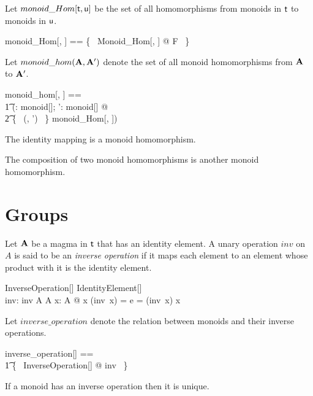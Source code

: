 \documentclass{amsart}
\begin{document}
Let $monoid\_Hom[\mathsf{t}, \mathsf{u}]$ be the set of all homomorphisms from monoids in $\mathsf{t}$
to monoids in $\mathsf{u}$.

\begin{zed}
	monoid\_Hom[\genT, \genU] == \{~ Monoid\_Hom[\genT, \genU] @ F ~\}
\end{zed}

Let $monoid\_hom(\mathbf{A}, \mathbf{A}')$ denote the set of all monoid homomorphisms from $\mathbf{A}$ to $\mathbf{A}'$.

\begin{zed}
	monoid\_hom[\genT, \genU] == \\
	\t1	(\lambda \strucA: monoid[\genT]; \strucA': monoid[\genU] @ \\
	\t2		\{~ (\strucA, \strucA') ~\} \dres monoid\_Hom[\genT, \genU])
\end{zed}

\begin{remark}
The identity mapping is a monoid homomorphism.
\end{remark}

\begin{remark}
The composition of two monoid homomorphisms is another monoid homomorphism.
\end{remark}

\section{Groups}

Let $\mathbf{A}$ be a magma in $\mathsf{t}$ that has an identity element.
A unary operation $inv$ on $A$ is said to be an \textit{inverse operation} if it maps each element
to an element whose product with it is the identity element.

\begin{schema}{InverseOperation}[\genT]
	IdentityElement[\genT] \\
	inv: \genT \pfun \genT
\where
	inv \in A \fun A
\also
	\forall x: A @ x \opG (inv~x) = e = (inv~x)  \opG x
\end{schema}

Let $inverse\_operation$ denote the relation between monoids and their inverse operations.
\begin{zed}
	inverse\_operation[\genT] == \\
	\t1	\{~ InverseOperation[\genT] @ \strucA \mapsto inv ~\}
\end{zed}

\begin{remark}
If a monoid has an inverse operation then it is unique.
\end{remark}
\end{document}
